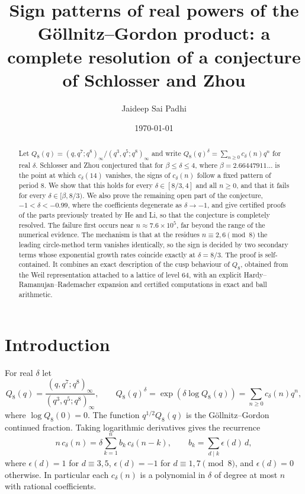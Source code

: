 \documentclass[11pt]{amsart}
\title[Real powers of the G\"ollnitz--Gordon product]{Sign patterns of real powers of the G\"ollnitz--Gordon product: a complete resolution of a conjecture of Schlosser and Zhou}
\author{Jaideep Sai Padhi}
\date{\today}
\theoremstyle{remark}
\theoremstyle{definition}
\begin{document}
\begin{abstract}
Let $Q_8(q)=(q,q^7;q^8)_\infty/(q^3,q^5;q^8)_\infty$ and write $Q_8(q)^\delta=\sum_{n\ge0}c_\delta(n)q^n$ for real $\delta$. Schlosser and Zhou conjectured that for $\beta\le\delta\le4$, where $\beta=2.66447911\ldots$ is the point at which $c_\delta(14)$ vanishes, the signs of $c_\delta(n)$ follow a fixed pattern of period $8$. We show that this holds for every $\delta\in[8/3,4]$ and all $n\ge0$, and that it fails for every $\delta\in[\beta,8/3)$. We also prove the remaining open part of the conjecture, $-1<\delta<-0.99$, where the coefficients degenerate as $\delta\to-1$, and give certified proofs of the parts previously treated by He and Li, so that the conjecture is completely resolved. The failure first occurs near $n\approx7.6\times10^5$, far beyond the range of the numerical evidence. The mechanism is that at the residues $n\equiv2,6\pmod8$ the leading circle-method term vanishes identically, so the sign is decided by two secondary terms whose exponential growth rates coincide exactly at $\delta=8/3$. The proof is self-contained. It combines an exact description of the cusp behaviour of $Q_8$, obtained from the Weil representation attached to a lattice of level $64$, with an explicit Hardy--Ramanujan--Rademacher expansion and certified computations in exact and ball arithmetic.
\end{abstract}

\maketitle

\section{Introduction}

For real $\delta$ let
\[
Q_8(q)=\frac{(q,q^7;q^8)_\infty}{(q^3,q^5;q^8)_\infty},\qquad Q_8(q)^\delta=\exp(\delta\log Q_8(q))=\sum_{n\ge0}c_\delta(n)q^n,
\]
where $\log Q_8(0)=0$. The function $q^{1/2}Q_8(q)$ is the G\"ollnitz--Gordon continued fraction. Taking logarithmic derivatives gives the recurrence
\begin{equation}\label{eq:rec}
n\,c_\delta(n)=\delta\sum_{k=1}^n b_k\,c_\delta(n-k),\qquad b_k=\sum_{d\mid k}\epsilon(d)\,d,
\end{equation}
where $\epsilon(d)=1$ for $d\equiv3,5$, $\epsilon(d)=-1$ for $d\equiv1,7\pmod 8$, and $\epsilon(d)=0$ otherwise. In particular each $c_\delta(n)$ is a polynomial in $\delta$ of degree at most $n$ with rational coefficients.
\end{document}
